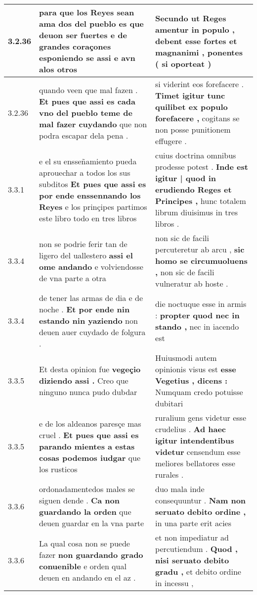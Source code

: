 \begin{tabular}{|p{1cm}|p{6.5cm}|p{6.5cm}|}
3.2.36 & para que los Reyes sean ama dos del pueblo es que deuon ser fuertes \textbf{ e de grandes coraçones esponiendo se assi } e avn alos otros & Secundo ut Reges amentur in populo , \textbf{ debent esse fortes et magnanimi , } ponentes ( si oporteat ) \\\hline
3.2.36 & quando veen que mal fazen . \textbf{ Et pues que assi es cada vno del pueblo teme de mal fazer cuydando } que non podra escapar dela pena . & si viderint eos forefacere . \textbf{ Timet igitur tunc quilibet ex populo forefacere , } cogitans se non posse punitionem effugere . \\\hline
3.3.1 & e el su ensseñamiento pueda aprouechar a todos los sus subditos \textbf{ Et pues que assi es por ende enssennando los Reyes } e los prinçipes partimos este libro todo en tres libros & cuius doctrina omnibus prodesse potest . \textbf{ Inde est igitur | quod in erudiendo Reges et Principes , } hunc totalem librum diuisimus in tres libros . \\\hline
3.3.4 & non se podrie ferir tan de ligero del uallestero \textbf{ assi el ome andando } e volviendosse de vna parte a otra & non sic de facili percuteretur ab arcu , \textbf{ sic homo se circumuoluens , } non sic de facili vulneratur ab hoste . \\\hline
3.3.4 & de tener las armas de dia e de noche . \textbf{ Et por ende nin estando nin yaziendo } non deuen auer cuydado de folgura . & die noctuque esse in armis : \textbf{ propter quod nec in stando , } nec in iacendo est \\\hline
3.3.5 & Et desta opinion fue \textbf{ vegeçio diziendo assi . } Creo que ninguno nunca pudo dubdar & Huiusmodi autem opinionis visus est \textbf{ esse Vegetius , dicens : } Numquam credo potuisse dubitari \\\hline
3.3.5 & e de los aldeanos paresçe mas cruel . \textbf{ Et pues que assi es parando mientes a estas cosas podemos iudgar } que los rusticos & ruralium gens videtur esse crudelius . \textbf{ Ad haec igitur intendentibus videtur } censendum esse meliores bellatores esse rurales . \\\hline
3.3.6 & ordonadamentedos males se siguen dende . \textbf{ Ca non guardando la orden } que deuen guardar en la vna parte & duo mala inde consequuntur . \textbf{ Nam non seruato debito ordine , } in una parte erit acies \\\hline
3.3.6 & La qual cosa non se puede fazer \textbf{ non guardando grado conuenible } e orden qual deuen en andando en el az . & et non impediatur ad percutiendum . \textbf{ Quod , nisi seruato debito gradu , } et debito ordine in incessu , \\\hline

\end{tabular}
